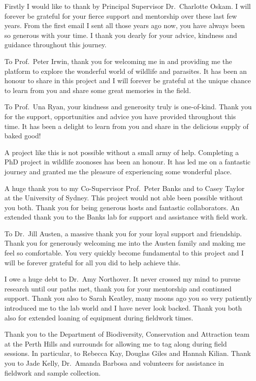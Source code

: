 \documentclass[a4paper, nobind]{templates/ociamthesis}
\begin{document}
\begin{romanpages}


\begin{acknowledgements}
 	Firstly I would like to thank by Principal Supervisor Dr.~Charlotte Oskam.
  I will forever be grateful for your fierce support and mentorship over these last few years.
  From the first email I sent all those years ago now, you have always been so generous with your time.
  I thank you dearly for your advice, kindness and guidance throughout this journey.

  To Prof.~Peter Irwin, thank you for welcoming me in and providing me the platform to explore the wonderful world of wildlife and parasites.
  It has been an honour to share in this project and I will forever be grateful at the unique chance to learn from you and share some great memories in the field.

  To Prof.~Una Ryan, your kindness and generosity truly is one-of-kind.
  Thank you for the support, opportunities and advice you have provided throughout this time.
  It has been a delight to learn from you and share in the delicious supply of baked good!

  A project like this is not possible without a small army of help. Completing a PhD project in wildlife zoonoses has been an honour.
  It has led me on a fantastic journey and granted me the pleasure of experiencing some wonderful place.

  A huge thank you to my Co-Supervisor Prof.~Peter Banks and to Casey Taylor at the University of Sydney. This project would not able been possible without you both.
  Thank you for being generous hosts and fantastic collaborators.
  An extended thank you to the Banks lab for support and assistance with field work.

  To Dr.~Jill Austen, a massive thank you for your loyal support and friendship.
  Thank you for generously welcoming me into the Austen family and making me feel so comfortable. You very quickly become fundamental to this project and I will be forever grateful for all you did to help achieve this.

  I owe a huge debt to Dr.~Amy Northover. It never crossed my mind to pursue research until our paths met, thank you for your mentorship and continued support. Thank you also to Sarah Keatley, many moons ago you so very patiently introduced me to the lab world and I have never look backed. Thank you both also for extended loaning of equipment during fieldwork times.

  Thank you to the Department of Biodiversity, Conservation and Attraction team at the Perth Hills and surrounds for allowing me to tag along during field sessions. In particular, to Rebecca Kay, Douglas Giles and Hannah Kilian. Thank you to Jade Kelly, Dr.~Amanda Barbosa and volunteers for assistance in fieldwork and sample collection.


\end{acknowledgements}
\end{romanpages}
\end{document}
